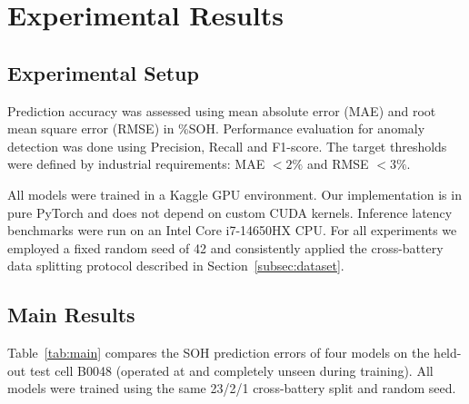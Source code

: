 \section{Experimental Results}
\label{sec:experiments}

\subsection{Experimental Setup}
\label{subsec:setup}

Prediction accuracy was assessed using mean absolute error (MAE) and root mean
square error (RMSE) in \%SOH. Performance evaluation for anomaly detection was
done using Precision, Recall and F1-score. The target thresholds were defined by
industrial requirements: MAE $< 2\%$ and RMSE $< 3\%$.

All models were trained in a Kaggle GPU environment. Our implementation is in
pure PyTorch and does not depend on custom CUDA kernels. Inference latency
benchmarks were run on an Intel Core i7-14650HX CPU. For all experiments we
employed a fixed random seed of 42 and consistently applied the cross-battery
data splitting protocol described in Section~\ref{subsec:dataset}.

\subsection{Main Results}
\label{subsec:main-results}

Table~\ref{tab:main} compares the SOH prediction errors of four models on the
held-out test cell B0048 (operated at  and completely unseen during
training). All models were trained using the same 23/2/1 cross-battery split and
random seed.

